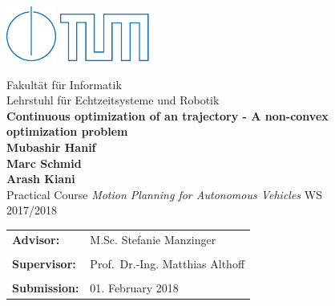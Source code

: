 \begin{figure}[!h]

  \includegraphics{./images/IN.pdf} \hfill \includegraphics{./images/tumlogo.pdf}
 
  \vspace*{1cm}
  {\large \textsf{Fakult{\"a}t f{\"u}r Informatik}}\\
  {\large \textsf{Lehrstuhl f{\"u}r Echtzeitsysteme und Robotik}}\\
   

  \vspace*{5cm}
%
%
%
%
  {\color{tumblue} \Huge \bf \textsf{Continuous optimization of an trajectory - A non-convex optimization problem}}\\  %

  \vspace*{1cm}
%
%
%
% 
  {\Large \bf \textsf{Mubashir Hanif}}\\   %
  {\Large \bf \textsf{Marc Schmid}}\\
  {\Large \bf \textsf{Arash Kiani}}\\
 
  \vspace*{8cm}
  {\Large \textsf{Practical Course \emph{Motion Planning for Autonomous Vehicles} WS 2017/2018}}\\
 
  \vspace*{1cm} 
  \begin{tabular}{ll}
%
%
%
%
    {\Large \bf \textsf{Advisor:}} &
    {\Large \textsf{M.Sc. Stefanie Manzinger}}\\                  %
    \\

    {\Large \bf \textsf{Supervisor:}} &
    {\Large \textsf{Prof.~Dr.-Ing. Matthias Althoff}}\\
    \\

%
%
%
%
    {\Large \bf \textsf{Submission:}} &
    {\Large \textsf{01. February 2018}}

  \end{tabular}
  
\end{figure}
